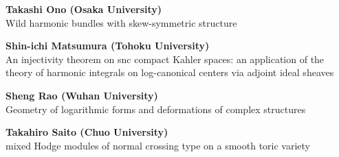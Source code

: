 \documentclass[dvipdfmx,a4paper,12pt]{article}
\theoremstyle{plain} %
\theoremstyle{definition} %
\begin{document}
\vskip3mm
{\bf Takashi Ono (Osaka University)}\\
Wild harmonic bundles with skew-symmetric structure 

\vskip3mm
{\bf Shin-ichi Matsumura (Tohoku University)}\\
An injectivity theorem on snc compact Kahler spaces: an application of the theory of harmonic integrals on log-canonical centers via adjoint ideal sheaves

\vskip5mm
\vskip1mm
 {\bf Sheng Rao (Wuhan University)}\\
Geometry of logarithmic forms and deformations of complex structures

\vskip3mm
{\bf Takahiro Saito (Chuo University)}\\
mixed Hodge modules of normal crossing type on a smooth toric 
variety





\begin{comment}

\begin{table}[htb]
\centering
  \begin{tabular}{| c | | c | c | c |}  \hline
  Time  & 3/22(水) & 3/23(木)& 3/23(金)  \\ \hline 
     \begin{tabular}{c} GMT 6:00-7:00 \\ (JST 15:00-16:00)\end{tabular}
&Shin-ichi Matsumura & Jihun Yum&Seungjae Lee \\ \hline
      \begin{tabular}{c}   GMT 7:10-8:10 \\ (JST 16:10-17:10)  \end{tabular}
& Junchao Shentu & Hoseob Seo&\sout{ Juanyong Wang}\\ \hline
 \begin{tabular}{c}   GMT 8:40-9:40\\ (JST 17:40-18:40) \end{tabular}
&  Feng Hao& F\'elix Lequen& Lukas Braun \\ \hline
 \begin{tabular}{c}   GMT 11:30-12:30\\ (JST 20:30-21:30) \end{tabular}
&  Xiaojun Wu &  Olivier Thom &    \\ \hline
  \end{tabular}
\end{table}
\end{comment}
\end{document}
